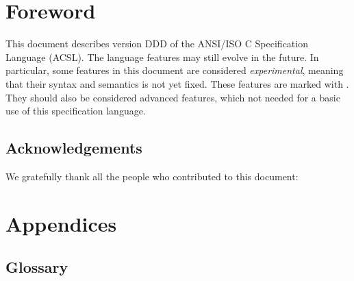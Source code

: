 \documentclass[web]{frama-c-book}
\renewcommand{\version}{DDD}
\begin{document}
\cleardoublepage
{}
\label{chap:contents}
\tableofcontents

\chapter*{Foreword}


This document describes version \version{} of the ANSI/ISO C Specification Language (ACSL). 
The language features may still evolve in the future. 
In particular, some features in this document
are considered \emph{experimental}, meaning that their syntax and
semantics is not yet fixed.  
These features are marked with
\experimental.  
They should also be considered advanced features,
which not needed for a basic use of this
specification language.

\section*{Acknowledgements}

We gratefully thank all the people who contributed to this document:












\appendix

\chapter{Appendices}
\label{chap:appendix}



\section{Glossary}
\label{sec:glossary}
\end{document}
